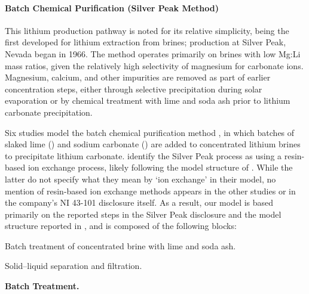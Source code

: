 \paragraph{Batch Chemical Purification (Silver Peak Method)}\label{app:04-methods-facilitychoices-batchchem}

This lithium production pathway is noted for its relative simplicity, being the first developed for lithium extraction from brines; production at Silver Peak, Nevada began in 1966. The method operates primarily on brines with low Mg:Li mass ratios, given the relatively high selectivity of magnesium for carbonate ions. Magnesium, calcium, and other impurities are removed as part of earlier concentration steps, either through selective precipitation during solar evaporation or by chemical treatment with lime and soda ash prior to lithium carbonate precipitation.

Six studies model the batch chemical purification method \citep{ambroseUnderstandingFutureLithium2020b, wesselkaemperOptimizationProcessingCosts2025, fengEnvironmentalImpactsLithium2025, sunRobustAssessmentsLithium2025, mousavinezhadNextLithiumBoom2025, schenkerCurrentFutureImpacts2025}, in which batches of slaked lime () and sodium carbonate () are added to concentrated lithium brines to precipitate lithium carbonate. \citet{mousavinezhadNextLithiumBoom2025} identify the Silver Peak process as using a resin-based ion exchange process, likely following the model structure of \citet{schenkerCurrentFutureImpacts2025}. While the latter do not specify what they mean by `ion exchange' in their model, no mention of resin-based ion exchange methods appears in the other studies or in the company's NI 43-101 disclosure itself. As a result, our model is based primarily on the reported steps in the Silver Peak disclosure and the model structure reported in \citet{wesselkaemperOptimizationProcessingCosts2025}, and is composed of the following blocks: 

\begin{description}[noitemsep, topsep=0pt]
    \item[\textbullet\enskip\texttt{batch\_treatment:}] Batch treatment of concentrated brine with lime and 
    soda ash.
    \item[\textbullet\enskip\texttt{sls\_step:}] Solid--liquid separation and filtration.
\end{description}

\medskip
\noindent\textbf{Batch Treatment.}\quad

